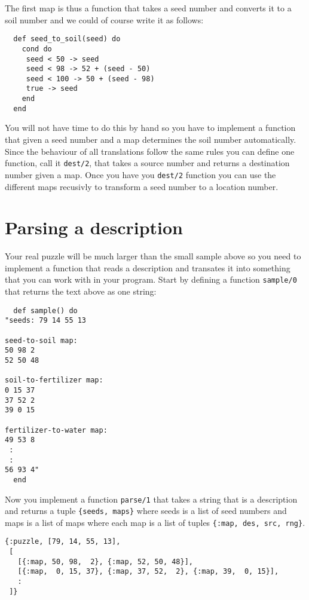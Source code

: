 \documentclass[a4paper,11pt]{article}
\begin{document}
The first map is thus a function that takes a seed number and converts
it to a soil number and we could of course write it as follows:

\begin{verbatim}
  def seed_to_soil(seed) do
    cond do
     seed < 50 -> seed
     seed < 98 -> 52 + (seed - 50)
     seed < 100 -> 50 + (seed - 98)
     true -> seed
    end
  end
\end{verbatim}

You will not have time to do this by hand so you have to implement a
function that given a seed number and a map determines the soil number
automatically. Since the behaviour of all translations follow the same
rules you can define one function, call it {\tt dest/2}, that takes a
source number and returns a destination number given a map. Once you
have you {\tt dest/2} function you can use the different maps
recusivly to transform a seed number to a location number.

\section*{Parsing a description}

Your real puzzle will be much larger than the small sample above so
you need to implement a function that reads a description and
transates it into something that you can work with in your
program. Start by defining a function {\tt sample/0} that returns the
text above as one string:

\begin{verbatim}
  def sample() do
"seeds: 79 14 55 13

seed-to-soil map:
50 98 2
52 50 48

soil-to-fertilizer map:
0 15 37
37 52 2
39 0 15

fertilizer-to-water map:
49 53 8
 :
 :
56 93 4"
  end
\end{verbatim}

Now you implement a function {\tt parse/1} that takes a string that is
a description and returns a tuple {\tt \{seeds, maps\}} where seeds is
a list of seed numbers and maps is a list of maps where each map is a
list of tuples {\tt \{:map, des, src, rng\}}. 

\begin{verbatim}
{:puzzle, [79, 14, 55, 13],
 [
   [{:map, 50, 98,  2}, {:map, 52, 50, 48}],
   [{:map,  0, 15, 37}, {:map, 37, 52,  2}, {:map, 39,  0, 15}],
   :
 ]}
\end{verbatim}
\end{document}
